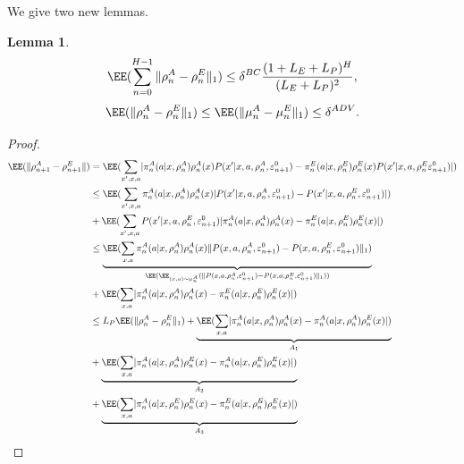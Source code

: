 \documentclass{article}
\theoremstyle{plain}
\newtheorem{lemma}[theorem]{Lemma}
\begin{document}
We give two new lemmas. 
\begin{lemma}
    \label{lemma:rhoA-rhoE_LP}
    \begin{equation}
        \label{eq:rhoA-rhoE_BC_LP=0}
        \EE(\sum_{n= 0}^{H-1}\|\rho^A_n - \rho^E_n \|_1) \leq \delta^{BC}\frac{(1 + L_E + L_P)^H}{ (L_E + L_P)^2},
    \end{equation}
    \begin{equation}
        \label{eq:rhoA-rhoE_ADV_LP}
        \EE(\|\rho^A_n - \rho^E_n \|_1) \leq \EE(\|\mu_{n}^A - \mu_{n}^E\|_1) \leq \delta^{ADV} .
    \end{equation}
\end{lemma}
\begin{proof}
    \begin{align*}
        \EE(\|\rho^A_{n+1}-\rho^E_{n+1}\|) &= \EE(\sum_{x', x, a}\lvert \pi^A_{n}(a\vert x, \rho_n^{A}) \rho^A_n(x)  P(x'\vert x, a,\rho^A_n,  \varepsilon^0_{n+1}) - \pi^E_{n}(a\vert x, \rho_n^{E}) \rho^E_n(x)  P(x'\vert x, a,\rho^E_n \varepsilon^0_{n+1})\rvert ) \\
        &\leq \EE(\sum_{x', x, a}\pi^A_{n}(a\vert x, \rho_n^{A}) \rho^A_n(x)  \lvert P(x'\vert x, a,\rho^A_n,  \varepsilon^0_{n+1}) - P(x'\vert x, a,\rho^E_n,  \varepsilon^0_{n+1}) \rvert  ) \\
        &+ \EE(\sum_{x',x, a}P(x'\vert x, a,\rho^E_n,  \varepsilon^0_{n+1}) \lvert \pi^A_{n}(a\vert x, \rho_n^{A}) \rho^A_n(x) - \pi^E_{n}(a\vert x, \rho_n^{E}) \rho^E_n(x) \rvert ) \\
        &\leq \underbrace{\EE(\sum_{x, a} \pi^A_{n}(a\vert x, \rho_n^{A}) \rho^A_n(x)  \| P( x, a,\rho^A_n,  \varepsilon^0_{n+1}) - P( x, a,\rho^E_n,  \varepsilon^0_{n+1}) \|_1 )}_{\EE(\EE_{(x, a)\sim\mu_n^A}(\| P( x, a,\rho^A_n,  \varepsilon^0_{n+1}) - P( x, a,\rho^E_n,  \varepsilon^0_{n+1}) \|_1))} \\
        &+ \EE(\sum_{x, a}\lvert \pi^A_{n}(a\vert x, \rho_n^{A}) \rho^A_n(x) - \pi^E_{n}(a\vert x, \rho_n^{E}) \rho^E_n(x) \rvert ) \\
        &\leq L_P \EE(\|\rho^A_n - \rho^E_n\|_1) + \underbrace{\EE(\sum_{x, a}\lvert \pi^A_{n}(a\vert x, \rho_n^{A}) \rho^A_n(x) - \pi^A_{n}(a\vert x, \rho_n^{A}) \rho^E_n(x) \rvert )}_{A_1} \\
        &+ \underbrace{\EE(\sum_{x, a}\lvert \pi^A_{n}(a\vert x, \rho_n^{A}) \rho^E_n(x) - \pi^A_{n}(a\vert x, \rho_n^{E}) \rho^E_n(x) \rvert )}_{A_2} \\
        &+ \underbrace{\EE(\sum_{x, a}\lvert \pi^A_{n}(a\vert x, \rho_n^{E}) \rho^E_n(x) - \pi^E_{n}(a\vert x, \rho_n^{E}) \rho^E_n(x) \rvert )}_{A_3}

\end{align*}
\end{proof}
\end{document}
